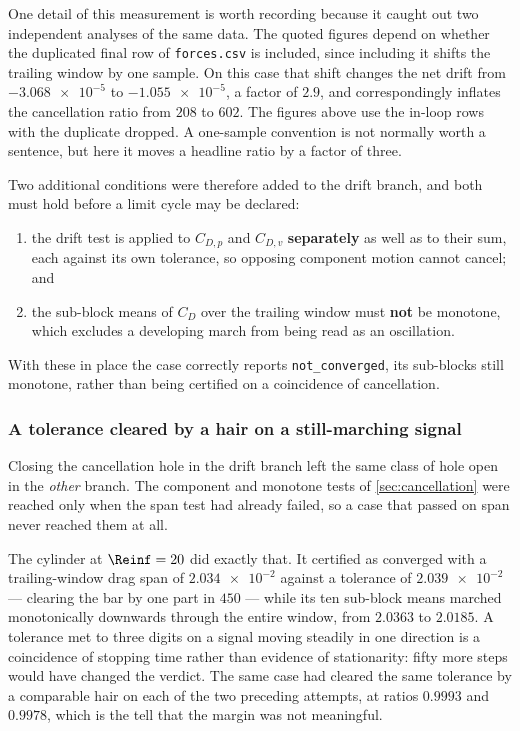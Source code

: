 One detail of this measurement is worth recording because it caught out two independent
analyses of the same data. The quoted figures depend on whether the duplicated final row
of \texttt{forces.csv} is included, since including it shifts the trailing window by one
sample. On this case that shift changes the net drift from $\num{-3.068e-5}$ to
$\num{-1.055e-5}$, a factor of $2.9$, and correspondingly inflates the cancellation ratio
from $208$ to $602$. The figures above use the in-loop rows with the duplicate dropped.
A one-sample convention is not normally worth a sentence, but here it moves a headline
ratio by a factor of three.

Two additional conditions were therefore added to the drift branch, and both must
hold before a limit cycle may be declared:
\begin{enumerate}
  \item the drift test is applied to $C_{D,p}$ and $C_{D,v}$ \textbf{separately} as
  well as to their sum, each against its own tolerance, so opposing component
  motion cannot cancel; and
  \item the sub-block means of $C_D$ over the trailing window must \textbf{not} be
  monotone, which excludes a developing march from being read as an oscillation.
\end{enumerate}
With these in place the case correctly reports \texttt{not\_converged}, its
sub-blocks still monotone, rather than being certified on a coincidence of
cancellation.

\subsubsection{A tolerance cleared by a hair on a still-marching signal}
\label{sec:hairsbreadth}

Closing the cancellation hole in the drift branch left the same class of hole open in
the \emph{other} branch. The component and monotone tests of \cref{sec:cancellation}
were reached only when the span test had already failed, so a case that passed on span
never reached them at all.

The cylinder at $\Reinf=20$ did exactly that. It certified as converged with a
trailing-window drag span of $\num{2.034e-2}$ against a tolerance of $\num{2.039e-2}$
--- clearing the bar by one part in $450$ --- while its ten sub-block means marched
monotonically downwards through the entire window, from $2.0363$ to $2.0185$. A
tolerance met to three digits on a signal moving steadily in one direction is a
coincidence of stopping time rather than evidence of stationarity: fifty more steps
would have changed the verdict. The same case had cleared the same tolerance by a
comparable hair on each of the two preceding attempts, at ratios $0.9993$ and
$0.9978$, which is the tell that the margin was not meaningful.

